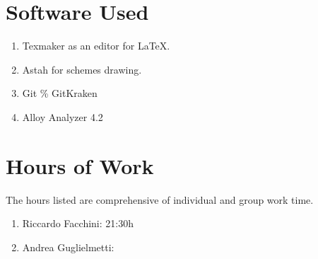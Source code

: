 \section{Software Used}
\begin{enumerate}
\item Texmaker as an editor for \LaTeX.
\item Astah for schemes drawing.
\item Git \% GitKraken
\item Alloy Analyzer 4.2
\end{enumerate}
\section{Hours of Work}
The hours listed are comprehensive of individual and group work time.
\begin{enumerate}
\item Riccardo Facchini: 21:30h
\item Andrea Guglielmetti: 
\end{enumerate}